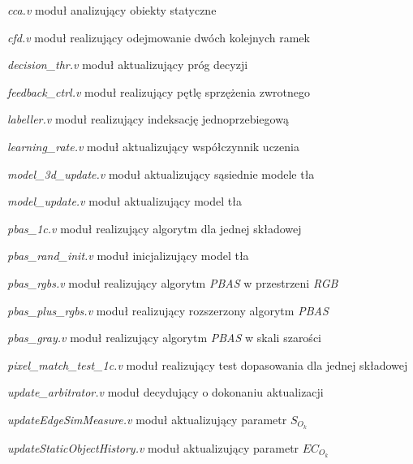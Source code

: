 \begin{eqwhere}[5cm]
    \item[\textit{cca.v}] moduł analizujący obiekty statyczne
    \item[\textit{cfd.v}] moduł realizujący odejmowanie dwóch kolejnych ramek
    \item[\textit{decision\_thr.v}] moduł aktualizujący próg decyzji
    \item[\textit{feedback\_ctrl.v}] moduł realizujący pętlę sprzężenia zwrotnego
    \item[\textit{labeller.v}] moduł realizujący indeksację jednoprzebiegową    
    \item[\textit{learning\_rate.v}] moduł aktualizujący współczynnik uczenia
    \item[\textit{model\_3d\_update.v}] moduł aktualizujący sąsiednie modele tła    
    \item[\textit{model\_update.v}] moduł aktualizujący model tła    
    \item[\textit{pbas\_1c.v}] moduł realizujący algorytm dla jednej składowej	    
    \item[\textit{pbas\_rand\_init.v}] moduł inicjalizujący model tła    
    \item[\textit{pbas\_rgbs.v}] moduł realizujący algorytm \textit{PBAS} w przestrzeni \textit{RGB}  
    \item[\textit{pbas\_plus\_rgbs.v}] moduł realizujący rozszerzony algorytm \textit{PBAS}   
    \item[\textit{pbas\_gray.v}] moduł realizujący algorytm \textit{PBAS} w skali szarości
    \item[\textit{pixel\_match\_test\_1c.v}] moduł realizujący test dopasowania dla jednej składowej
    \item[\textit{update\_arbitrator.v}] moduł decydujący o dokonaniu aktualizacji	
    \item[\textit{updateEdgeSimMeasure.v}] moduł aktualizujący parametr $S_{O_k}$	
    \item[\textit{updateStaticObjectHistory.v}] moduł aktualizujący parametr $EC_{O_k}$
\end{eqwhere}


